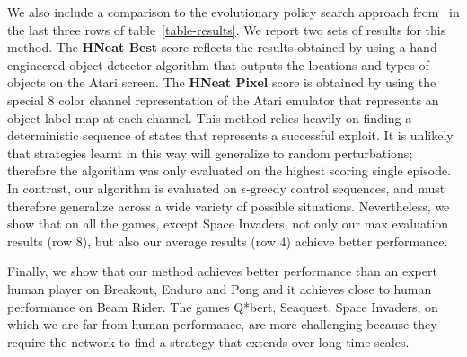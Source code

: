 \documentclass{article} %
\begin{document}
We also include a comparison to the evolutionary policy search approach from~\cite{hausknecht-neuro} in the last three rows of table~\ref{table-results}.   
We report two sets of results for this method. The \textbf{HNeat Best} score reflects the results obtained by using a hand-engineered object detector algorithm that outputs the locations and types of objects on the Atari screen. The \textbf{HNeat Pixel} score is obtained by using the special 8 color channel representation of the Atari emulator that represents an object label map at each channel. 
This method relies heavily on finding a deterministic sequence of states that represents a successful exploit. It is unlikely that strategies learnt in this way will generalize to random perturbations; therefore the algorithm was only evaluated on the highest scoring single episode. In contrast, our algorithm is evaluated on $\epsilon$-greedy control sequences, and must therefore generalize across a wide variety of possible situations.  Nevertheless, we show that on all the games, except Space Invaders, not only our max evaluation results (row $8$), but also our average results (row $4$) achieve better performance.

Finally, we show that our method achieves better performance than an expert human player on Breakout, Enduro and Pong and it achieves close to human performance on Beam Rider. The games Q*bert, Seaquest, Space Invaders, on which we are far from human performance, are more challenging because they require the network to find a strategy that extends over long time scales.  


\vspace{-0.3cm}
\end{document}
